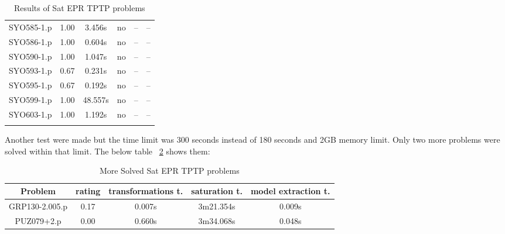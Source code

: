 \begin{center}
\begin{longtable}{||c | c | c | c | c | c||}
SYO585-1.p & 1.00 & 3.456s & no & -- & -- \\
SYO586-1.p & 1.00 & 0.604s & no & -- & -- \\
SYO590-1.p & 1.00 & 1.047s & no & -- & -- \\
SYO593-1.p & 0.67 & 0.231s & no & -- & -- \\
SYO595-1.p & 0.67 & 0.192s & no & -- & -- \\
SYO599-1.p & 1.00 & 48.557s & no & -- & -- \\
SYO603-1.p & 1.00 & 1.192s & no & -- & -- \\
		\bottomrule
		\caption{Results of Sat EPR TPTP problems}
		\label{table:sat_epr_results}
		\end{longtable}
	\end{center}

Another test were made but the time limit was 300 seconds instead of 180 seconds and 2GB memory limit. Only two more problems were solved within that limit. The below table ~\ref{table:more_sat_epr_results} shows them:

\begin{table}[H]
	\centering
	\begin{tabular}{||c | c | c | c | c||} 
 		\toprule
		\cellcolor[HTML]{CCCCCC} Problem & \cellcolor[HTML]{CCCCCC} rating & \cellcolor[HTML]{CCCCCC} transformations t. & \cellcolor[HTML]{CCCCCC} saturation t. & \cellcolor[HTML]{CCCCCC} model extraction t. \\ %
		\midrule
		\midrule
GRP130-2.005.p & 0.17 & 0.007s & 3m21.354s & 0.009s \\
PUZ079+2.p & 0.00 & 0.660s & 3m34.068s & 0.048s \\
		\bottomrule
	\end{tabular}
	\caption{More Solved Sat EPR TPTP problems}
	\label{table:more_sat_epr_results}
\end{table}





\begin{comment}
\chapter{Forms of first order logic formulas}
Different forms of first order logic formulas.

\chapter{Algorithms}
Different Algorithms used.
\end{comment}